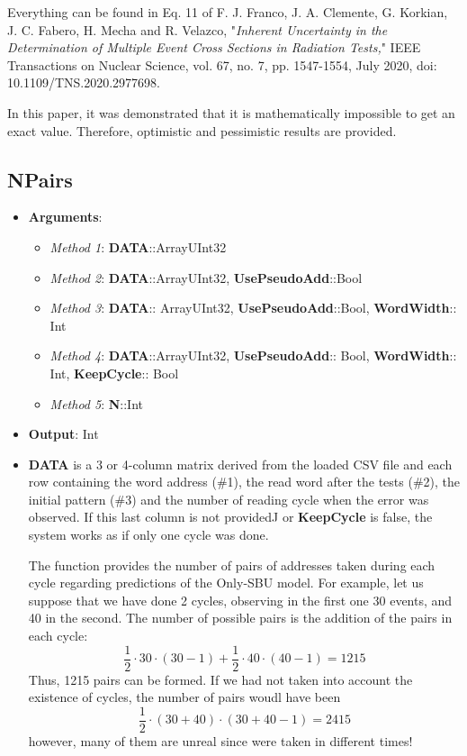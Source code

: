 \begin{itemize}
	Everything can be found in Eq. 11 of F. J. Franco, J. A. Clemente, G. Korkian, 
	J. C. Fabero, H. Mecha and R. Velazco, "\textit{Inherent Uncertainty in the Determination of Multiple 
		Event Cross Sections in Radiation Tests,}" IEEE Transactions on Nuclear Science, vol. 67, no. 7, 
	pp. 1547-1554, July 2020, doi: 10.1109/TNS.2020.2977698.
	
	In this paper, it was demonstrated that it is mathematically impossible to get an exact value. Therefore,  optimistic and pessimistic results are provided.
\end{itemize}
%
\subsection*{NPairs}
\begin{itemize}
	\item \textbf{Arguments}:
		\begin{itemize}
			\item \textit{Method 1}: \textbf{DATA}::Array{UInt32}
			\item \textit{Method 2}: \textbf{DATA}::Array{UInt32}, \textbf{UsePseudoAdd}::Bool
			\item \textit{Method 3}: \textbf{DATA}:: Array{UInt32}, \textbf{UsePseudoAdd}::Bool, \textbf{WordWidth}:: Int
			\item \textit{Method 4}: \textbf{DATA}::Array{UInt32}, \textbf{UsePseudoAdd}:: Bool, \textbf{WordWidth}:: Int, \textbf{KeepCycle}:: Bool
			\item \textit{Method 5}: \textbf{N}::Int
		\end{itemize}
	\item \textbf{Output}: Int
	\item \textbf{DATA} is a 3 or 4-column matrix derived from the loaded CSV file and each row containing the word address (\#1), the read word after the tests (\#2), the initial pattern (\#3) and the number of reading cycle when the error was observed. If this last column is not providedJ or \textbf{KeepCycle} is false, the system works as if only one cycle was done. 
	
	The function provides the number of pairs of addresses taken during each cycle regarding predictions of the Only-SBU model. For example, let us suppose that we have done 2 cycles, observing in the first one 30 events, and 40 in the second. The number of possible pairs is the addition of the pairs in each cycle:
	\[
		\frac{1}{2}\cdot 30\cdot(30-1)+\frac{1}{2}\cdot 40\cdot(40-1) = 1215
	\]
	Thus, 1215 pairs can be formed. If we had not taken into account the existence of cycles, the number of pairs woudl have been\[	\frac{1}{2}\cdot (30+40)\cdot(30+40-1) = 2415\]
	however, many of them are unreal since were taken in different times!
	

\end{itemize}

